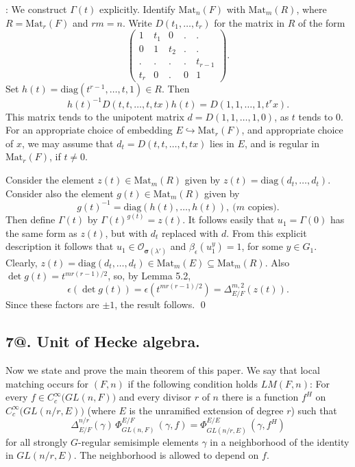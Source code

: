 \documentclass{amsart}
\begin{document}
:  We construct $\Gamma(t)$ explicitly.  Identify
$\text{Mat}_n(F)$ with $\text{Mat}_m(R)$, where $R = \text{Mat}_r(F)$
and $rm=n$.  Write $D(t_1,\ldots,t_r)$ for the matrix in $R$ of the
form
$$\begin{pmatrix} 1& t_1& 0 & . & . \\
	   0& 1  & t_2&. &.  \\
	   .& .  & .  &. &t_{r-1}\\
	   t_r&0 & . & 0 &1\end{pmatrix}.$$
Set $h(t) = \text{diag}(t^{r-1},\ldots,t,1)\in R$.  Then
$$h(t)^{-1}D(t,t,\ldots,t,tx)h(t) = D(1,1,\ldots,1,t^rx).$$  This
matrix tends to the unipotent matrix
  $d = D(1,1,\ldots,1,0)$, as $t$ tends to $0$.  For an
appropriate choice of embedding $E\hookrightarrow \text{Mat}_r(F)$, 
and appropriate
choice of $x$, we may assume that $d_t=D(t,t,\ldots,t,tx)$ lies in $E$,
and is regular in $\text{Mat}_r(F)$, if $t\ne 0$.

Consider the element $z(t) \in \text{Mat}_m(R)$ given by
$z(t) = \text{diag}(d_t,\ldots,d_t)$.
Consider also the element $g(t) \in \text{Mat}_m(R)$ given by
$$g(t)^{-1} = \text{diag}(h(t),\ldots,h(t)),\ \text{($m$ copies)}.$$
Then define $\Gamma(t)$ by
  $\Gamma(t)^{g(t)}= z(t)$.  It follows easily that
$u_1 = \Gamma(0)$ has the same form as $z(t)$, but with $d_t$ replaced
with $d$.  From this explicit description it follows that $u_1\in
{\mathcal O}_{\pmb\sigma(\lambda')}$ and $\beta_\epsilon(u_1^y)=1$, for
some $y\in G_1$.
%
Clearly, $z(t) = \text{diag}(d_t,\ldots,d_t) \in \text{Mat}_m(E) \subseteq
\text{Mat}_m(R)$.  Also $\det g(t) = t^{mr(r-1)/2}$, so, by Lemma 5.2,
$$\epsilon(\det g(t)) = \epsilon(t^{mr(r-1)/2}) = 
\Delta^{m,2}_{E/F}(z(t)).$$
Since these factors are $\pm1$, the result follows.
\qed
\finishpproclaim

\subsection{{\bf 7@.  Unit of Hecke algebra.}}

\medskip
\noindent
Now we state and prove the main theorem of this paper.
We say that local matching occurs for
  $ (F, n ) $
if the following condition holds
  $ LM(F,n) $: 
For every
  $ f \in C_c^{\infty}
    \bigl(
      GL(n, F)
    \bigr) $
and every divisor $r$ of $n$
there is a function
  $ f^H $
on
  $ C_c^{\infty}
    \bigl(
        GL ( n / r, E )
    \bigr) $
(where $E$ is the unramified extension of degree
  $ r $)
such that
%
$$
  \Delta_{E/F}^{n/r}
  (\gamma) \,
  \Phi_{GL(n, F)}^{E/F} \,
  (\gamma, f) =
  \Phi_{GL(n/r, E)}^{E/E} \,
  (\gamma, f^H)
$$
%
for all strongly $G$-regular semisimple elements
  $ \gamma $
in a neighborhood of the identity in
  $ GL (n/r, E) $.
The neighborhood is allowed to depend on $f$.
\end{document}
